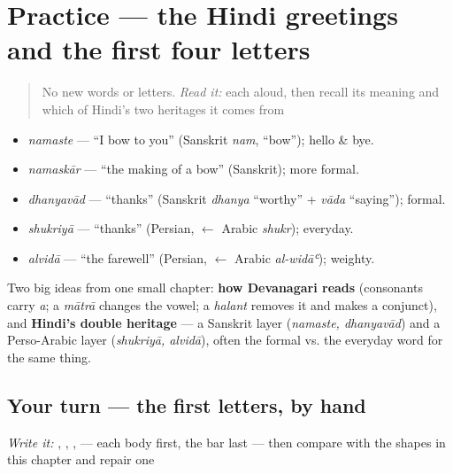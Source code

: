 \section[Practice]{Practice — the Hindi greetings and the first four letters}

\label{lesson:HI-C01-practice}



\begin{quote}
No new words or letters. \emph{Read it:} each aloud, then recall its meaning and which of Hindi's two heritages it comes from
\end{quote}

\begin{grammarlens}[title={What you've built}]
\begin{itemize}
\raggedright
  \item \textbf{} \emph{namaste} — \textquotedblleft{}I bow to you\textquotedblright{} (Sanskrit \emph{nam}, \textquotedblleft{}bow\textquotedblright{}); hello \& bye.
  \item \textbf{} \emph{namaskār} — \textquotedblleft{}the making of a bow\textquotedblright{} (Sanskrit); more formal.
  \item \emph{dhanyavād} — \textquotedblleft{}thanks\textquotedblright{} (Sanskrit \emph{dhanya} \textquotedblleft{}worthy\textquotedblright{} + \emph{vāda} \textquotedblleft{}saying\textquotedblright{}); formal.
  \item \emph{shukriyā} — \textquotedblleft{}thanks\textquotedblright{} (Persian, $\leftarrow$ Arabic \emph{shukr}); everyday.
  \item \emph{alvidā} — \textquotedblleft{}the farewell\textquotedblright{} (Persian, $\leftarrow$ Arabic \emph{al-widāʿ}); weighty.
\end{itemize}

Two big ideas from one small chapter: \textbf{how Devanagari reads} (consonants carry \emph{a}; a \emph{mātrā} changes the vowel; a \emph{halant} removes it and makes a conjunct), and \textbf{Hindi's double heritage} — a Sanskrit layer (\emph{namaste, dhanyavād}) and a Perso-Arabic layer (\emph{shukriyā, alvidā}), often the formal vs. the everyday word for the same thing.
\end{grammarlens}

\subsection*{Your turn — the first letters, by hand}
\emph{Write it:} , , ,  — each body first, the bar last — then compare with the shapes in this chapter and repair one

